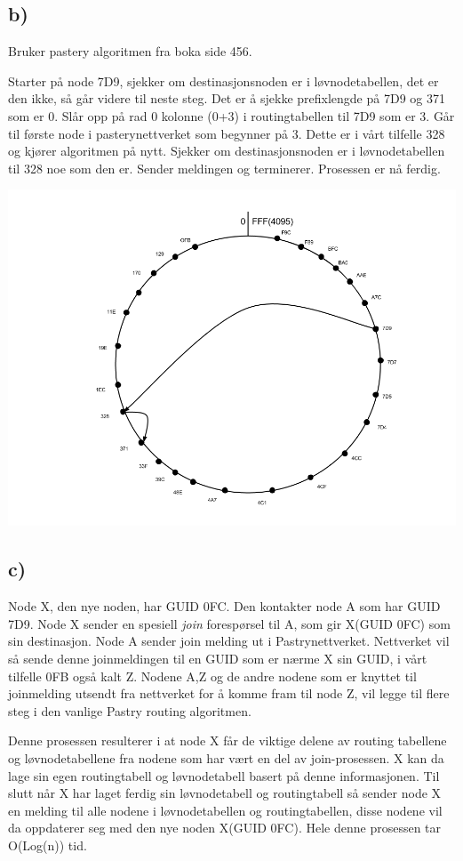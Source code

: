 \documentclass{article}
\begin{document}
\subsection*{b)}
Bruker pastery algoritmen fra boka side 456.

Starter på node 7D9, sjekker om destinasjonsnoden er i løvnodetabellen, det er den ikke, så går videre til neste steg. Det er å sjekke prefixlengde på 7D9 og 371 som er 0. Slår opp på rad 0 kolonne (0+3) i routingtabellen til 7D9 som er 3. Går til første node i pasterynettverket som begynner på 3. Dette er i vårt tilfelle 328 og kjører algoritmen på nytt. Sjekker om destinasjonsnoden er i løvnodetabellen til 328 noe som den er. Sender meldingen og terminerer. Prosessen er nå ferdig.
\begin{center}
	\includegraphics[scale=0.5]{Images/Pastry}
\end{center}
\subsection*{c)}
Node X, den nye noden, har GUID 0FC. Den kontakter node A som har GUID 7D9. Node X sender en spesiell \emph{join} forespørsel til A, som gir X(GUID 0FC) som sin destinasjon. Node A sender join melding ut i Pastrynettverket. Nettverket vil så sende denne joinmeldingen til en GUID som er nærme X sin GUID, i vårt tilfelle 0FB også kalt Z. Nodene A,Z og de andre nodene som er knyttet til joinmelding utsendt fra nettverket for å komme fram til node Z, vil legge til flere steg i den vanlige Pastry routing algoritmen. 

Denne prosessen resulterer i at node X får de viktige delene av routing tabellene og løvnodetabellene fra nodene som har vært en del av join-prosessen. X kan da lage sin egen routingtabell og løvnodetabell basert på denne informasjonen. Til slutt når X har laget ferdig sin løvnodetabell og routingtabell så sender node X en melding til alle nodene i løvnodetabellen og routingtabellen, disse nodene vil da oppdaterer seg med den nye noden X(GUID 0FC). Hele denne prosessen tar O(Log(n)) tid.
\end{document}
